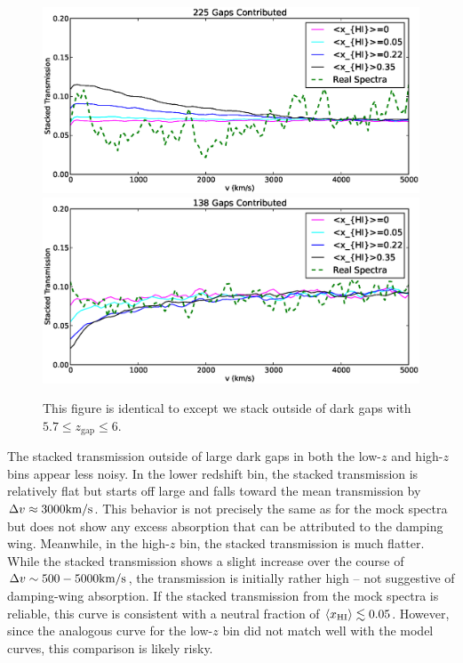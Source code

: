 \begin{figure}[!ht]
  \centering
  \includegraphics[width=12cm]{smallstack_mesinger.eps}
  \includegraphics[width=12cm]{largestack_mesinger.eps}
  \caption{This figure is identical to  except we stack outside of dark gaps with $5.7 \leq z_{\text{gap}} \leq 6$.}
  \label{fig:LargePreliminary}
\end{figure}


The stacked transmission outside of large dark gaps in both the low-$z$ and high-$z$ bins appear less noisy. In the lower redshift bin, the stacked transmission is relatively flat but starts off large and falls toward the mean transmission by $\Delta v \approx 3000\text{km}/\text{s}$. This behavior is not precisely the same as for the mock spectra but does not show any excess absorption that can be attributed to the damping wing. Meanwhile, in the high-$z$ bin, the stacked transmission is much flatter. While the stacked transmission shows a slight increase over the course of $\Delta v \sim 500-5000\text{km}/\text{s}$, the transmission is initially rather high -- not suggestive of damping-wing absorption. If the stacked transmission from the mock spectra is reliable, this curve is consistent with a neutral fraction of $\langle x_{\text{HI}}\rangle \lesssim 0.05$. However, since the analogous curve for the low-$z$ bin did not match well with the model curves, this comparison is likely risky. 


